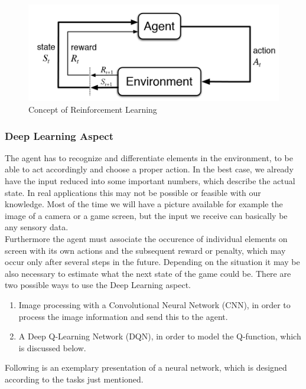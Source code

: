 		\begin{figure}[h!]
			\begin{center}
				\includegraphics[width=0.6\linewidth]{img/eoeSq.png}
				\caption{Concept of Reinforcement Learning}
				\label{concept}
			\end{center}
		\end{figure}

	\subsubsection{Deep Learning Aspect}
		The agent has to recognize and differentiate elements in the environment, to be able to act accordingly and choose a proper action. In the best case, we already have the input reduced into some important numbers, which describe the actual state. In real applications this may not be possible or feasible with our knowledge. Most of the time we will have a picture available for example the image of a camera or a game screen, but the input we receive can basically be any sensory data.\\
		Furthermore the agent must associate the occurence of individual elements on screen with its own actions and the subsequent reward or penalty, which may occur only after several steps in the future. Depending on the situation it may be also necessary to estimate what the next state of the game could be. There are two possible ways to use the Deep Learning aspect.\\	
		\begin{enumerate}
			\item Image processing with a Convolutional Neural Network (CNN), in order to process the image information and send this to the agent.
			\item A Deep Q-Learning Network (DQN), in order to model the Q-function, which is discussed below.
		\end{enumerate}
		Following is an exemplary presentation of a neural network, which is designed according to the tasks just mentioned.\\

